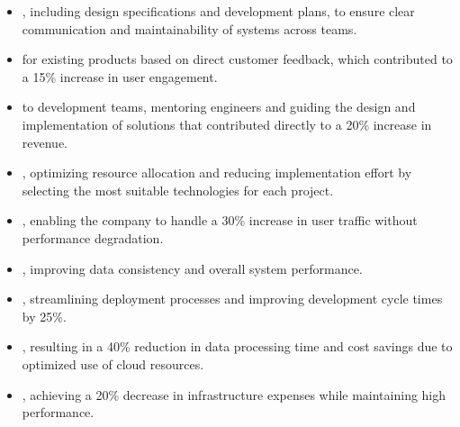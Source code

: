 \begin{itemize}
  \item {}, including design specifications and development plans, to ensure clear communication and maintainability of systems across teams.

  \item {} for existing products based on direct customer feedback, which contributed to a 15\% increase in user engagement.

  \item {} to development teams, mentoring engineers and guiding the design and implementation of solutions that contributed directly to a 20\% increase in revenue.

  \item {}, optimizing resource allocation and reducing implementation effort by selecting the most suitable technologies for each project.

  \item {}, enabling the company to handle a 30\% increase in user traffic without performance degradation.

  \item {}, improving data consistency and overall system performance.

  \item {}, streamlining deployment processes and improving development cycle times by 25\%.

  \item {}, resulting in a 40\% reduction in data processing time and cost savings due to optimized use of cloud resources.

  \item {}, achieving a 20\% decrease in infrastructure expenses while maintaining high performance.

\end{itemize}

\divider

